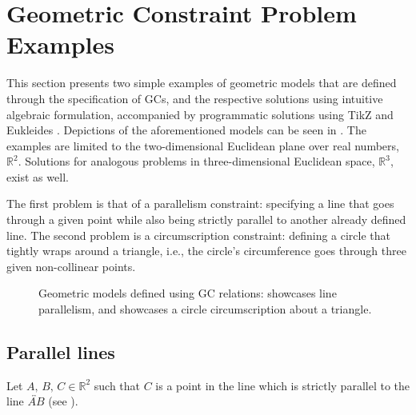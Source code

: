\section{Geometric Constraint Problem Examples}
\label{sec:intro.examples}

This section presents two simple examples of geometric models that are defined
through the specification of \acp{GC}, and the respective solutions using
intuitive algebraic formulation, accompanied by programmatic solutions using
\acs{TikZ} \cite{Tantau:2015:tikz-manual} and Eukleides \cite{Obrecht:2010:EM}.
Depictions of the aforementioned models can be seen in .
The examples are limited to the two-dimensional Euclidean plane over real
numbers, $\mathbb{R}^2$.  Solutions for analogous problems in three-dimensional
Euclidean space, $\mathbb{R}^3$, exist as well.

The first problem is that of a parallelism constraint: specifying a line that
goes through a given point while also being strictly parallel to another already
defined line.  The second problem is a circumscription constraint: defining a
circle that tightly wraps around a triangle, i.e., the circle's circumference
goes through three given non-collinear points.

\begin{figure}[htbp]
  \centering%
  \hspace{\fill}%
  \caption[Geometric models defined using \acsp{GC}]{
    Geometric models defined using \ac{GC} relations:
     showcases line parallelism, and
     showcases a circle circumscription
    about a triangle.}%
  \label{fig:intro.example}
\end{figure}

\subsection{Parallel lines}
\label{sec:intro.examples.parallel}
Let $A,\,B,\,C \in \mathbb{R}^2$ such that $C$ is a point in the line which is
strictly parallel to the line $\overleftrightarrow{AB}$ (see
).

